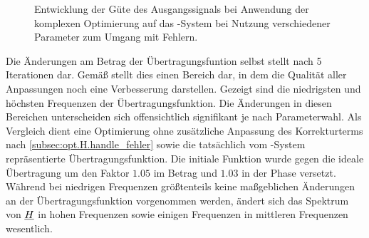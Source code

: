 \documentclass[../Report.tex]{subfiles}
\begin{document}
\begin{figure}[htb]
\begin{center}
	\caption{Entwicklung der Güte des Ausgangssignals bei Anwendung der komplexen Optimierung auf das \mock-System bei Nutzung verschiedener Parameter zum Umgang mit Fehlern.}
	\label{fig:opt.H.mock_quality}
\end{center}
\end{figure}


Die Änderungen am Betrag der Übertragungsfuntion selbst stellt  nach 5 Iterationen dar. Gemäß  stellt dies einen Bereich dar, in dem die Qualität aller Anpassungen noch eine Verbesserung darstellen.
Gezeigt sind die niedrigsten und höchsten Frequenzen der Übertragungsfunktion. Die Änderungen in diesen Bereichen unterscheiden sich offensichtlich signifikant je nach Parameterwahl. 
Als Vergleich dient eine Optimierung ohne zusätzliche Anpassung des Korrekturterms nach \ref{subsec:opt.H.handle_fehler} sowie die tatsächlich vom \mock-System repräsentierte Übertragungsfunktion.
Die initiale Funktion wurde gegen die ideale Übertragung um den Faktor $1.05$ im Betrag und $1.03$ in der Phase versetzt.
Während bei niedrigen Frequenzen größtenteils keine maßgeblichen Änderungen an der Übertragungsfunktion vorgenommen werden, ändert sich das Spektrum von $\underline{H}$ in hohen Frequenzen sowie einigen Frequenzen in mittleren Frequenzen wesentlich.
\end{document}
